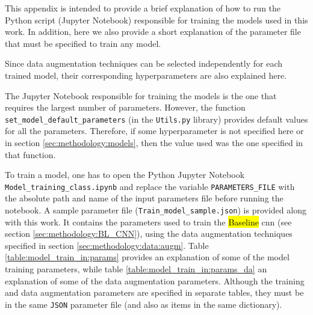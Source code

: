 
\glsresetall

This appendix is intended to provide a brief explanation of how to run the Python script (Jupyter Notebook) responsible for training the models used in this work. In addition, here we also provide a short explanation of the parameter file that must be specified to train any model.

Since data augmentation techniques can be selected independently for each trained model, their corresponding hyperparameters are also explained here.

The Jupyter Notebook responsible for training the models is the one that requires the largest number of parameters. However, the function \texttt{set\_model\_default\_parameters} (in the \texttt{Utils.py} library) provides default values for all the parameters. Therefore, if some hyperparameter is not specified here or in section \ref{sec:methodology:models}, then the value used was the one specified in that function.

To train a model, one has to open the Python Jupyter Notebook \\
\noindent\texttt{Model\_training\_class.ipynb} and replace the variable \texttt{PARAMETERS\_FILE} with the absolute path and name of the input parameters file before running the notebook. A sample parameter file (\texttt{Train\_model\_sample.json}) is provided along with this work. It contains the parameters used to train the \hl{Baseline} \gls{cnn} (see section \ref{sec:methodology:BL_CNN}), using the data augmentation techniques specified in section \ref{sec:methodology:data:augm}.
Table \ref{table:model_train_in:params} provides an explanation of some of the model training parameters, while table \ref{table:model_train_in:params_da} an explanation of some of the data augmentation parameters. Although the training and data augmentation parameters are specified in separate tables, they must be in the same \texttt{JSON} parameter file (and also as items in the same dictionary).

\setlength{\mylinewidth}{\linewidth-7pt}%
\setlength{\mylengtha}{0.3\mylinewidth-2\arraycolsep}%
\setlength{\mylengthb}{0.7\mylinewidth-2\arraycolsep}%

